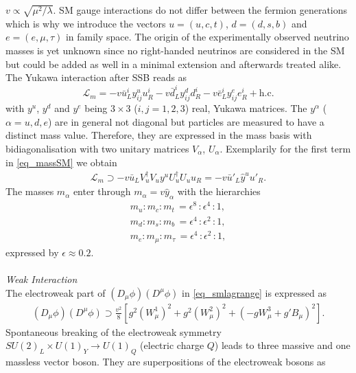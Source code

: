 $v\propto\sqrt{\mu^2/\lambda}$. 
SM gauge interactions do not differ between the fermion generations which is why we introduce the vectors
$u=(u,c,t)$, $d=(d,s,b)$ and $e=(e,\mu,\tau)$ in family space. The origin of the experimentally observed neutrino masses is yet unknown since
no right-handed neutrinos are considered in the SM but could be added as well in a minimal extension and afterwards treated alike.
The Yukawa interaction after SSB reads as
\begin{equation}
 \mathcal{L}_m = -v \bar u^i_L y^u_{ij}u^i_R -v \bar d^i_Ly^d_{ij} d^i_R -v \bar e^i_Ly^e_{ij} e^i_R + \text{h.c.}
 \label{eq_massSM}
\end{equation}
with $y^u$, $y^d$ and $y^e$ being $3\times 3$ ($i,j=1,2,3$) real, Yukawa matrices.
The $y^\alpha$ ($\alpha=u,d,e$) are in general not diagonal but particles are measured to have a distinct mass value. Therefore, they are expressed
in the mass basis with bidiagonalisation with two unitary matrices $V_\alpha$, $U_\alpha$. Exemplarily for the first term in \eqref{eq_massSM}
we obtain
\begin{align}
 \mathcal{L}_m \supset -v \bar u_L V_u^\dagger V_u y^u U^\dagger_u U_u u_R = -v \bar u'_L \hat{y}^u u'_R.
 \label{eq_diracmass}
\end{align}
The masses $m_\alpha$ enter through $m_\alpha = v\hat{y}_\alpha$ with the hierarchies \cite{0712.1419}
\begin{equation}
\begin{aligned}
 m_u:m_c:m_t\,=\epsilon^8\,:\epsilon^4\,:1,\\
 m_d:m_s:m_b\,=\epsilon^4\,:\epsilon^2\,:1,\\
 m_e:m_\mu:m_\tau\, = \epsilon^4\,:\epsilon^2\,:1,
\end{aligned}
 \label{eq_masshierarchy}
\end{equation}
expressed by $\epsilon\approx0.2$. 
\\ \\ \textit{Weak Interaction}\\
\noindent The electroweak part of $\left(D_\mu\phi\right)\left(D^\mu\phi\right)$ in \eqref{eq_smlagrange} is expressed as
\begin{align}
 \left(D_\mu\phi\right)\left(D^\mu\phi\right) \supset \frac{v^2}{8} \left[g^2(W^1_\mu)^2 + g^2(W^2_\mu)^2 + (-gW^3_\mu+g'B_\mu)^2\right].
\end{align}
Spontaneous breaking of the electroweak symmetry $SU(2)_L\times U(1)_Y\rightarrow U(1)_Q$ (electric charge $Q$) leads to three massive
and one massless vector boson. They are superpositions of the electroweak bosons as 
